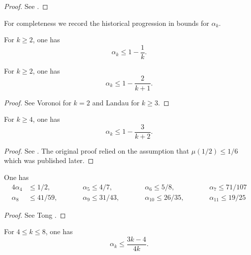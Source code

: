\begin{proof}  See \cite[\S 13.3]{ivic}.
\end{proof}

For completeness we record the historical progression in bounds for $\alpha_k$.
\begin{lemma}\label{piltz-alpha}
For $k \ge 2$, one has
\[
\alpha_k \le 1 - \frac{1}{k}.
\]
\end{lemma}
\begin{lemma}\label{voronoi-alpha}
For $k \ge 2$, one has
\[
\alpha_k \leq 1 - \frac{2}{k + 1}.
\]
\end{lemma}
\begin{proof}
See Voronoi \cite{voronoi_sur_1903} for $k = 2$ and Landau \cite{landau_uber_1912} for $k \ge 3$.
\end{proof}

\begin{lemma}\label{hl-alpha}
For $k \ge 4$, one has
\[
\alpha_k \leq 1 - \frac{3}{k + 2}.
\]
\end{lemma}
\begin{proof}
See \cite{hardy_littlewood_approximate_1923}. The original proof relied on the assumption that $\mu(1/2) \le 1/6$ which was published later.
\end{proof}

\begin{lemma}
One has
\begin{alignat*}{4}
\alpha_4 &\le 1/2,\qquad &&\alpha_5 \le 4/7,\qquad &&\alpha_6 \le 5/8,\qquad &&\alpha_7 \le 71/107\\
\alpha_8 &\le 41/59,\qquad &&\alpha_9 \le 31/43,\qquad &&\alpha_{10} \le 26/35,\qquad &&\alpha_{11}\le 19/25
\end{alignat*}
\end{lemma}
\begin{proof}
See Tong \cite{Tong_divisor}.
\end{proof}

\begin{theorem}\cite{heathbrown_mean_1981} For $4 \le k \le 8$, one has
\[
\alpha_k \leq \frac{3k-4}{4k}.
\]
\end{theorem}

